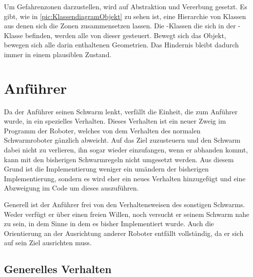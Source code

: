 Um Gefahrenzonen darzustellen, wird auf Abstraktion und Vererbung gesetzt. Es gibt, wie in \autoref{pic:KlassendiagramObjekt} zu sehen ist, eine Hierarchie von Klassen aus denen sich die Zonen zusammensetzen lassen. Die -Klassen die sich in der -Klasse befinden, werden alle von dieser gesteuert. Bewegt sich das Objekt, bewegen sich alle darin enthaltenen Geometrien. Das Hindernis bleibt dadurch immer in einem plausiblen Zustand. 


%










\section{Anführer}

Da der Anführer seinen Schwarm lenkt, verfällt die Einheit, die zum Anführer wurde, in ein spezielles Verhalten. Dieses Verhalten ist ein neuer Zweig im Programm der Roboter, welches von dem Verhalten des normalen Schwarmroboter gänzlich abweicht. Auf das Ziel zuzusteuern und den Schwarm dabei nicht zu verlieren, ihn sogar wieder einzufangen, wenn er abhanden kommt, kann mit den bisherigen Schwarmregeln nicht umgesetzt werden. Aus diesem Grund ist die Implementierung weniger ein umändern der bisherigen Implementierung, sondern es wird eher ein neues Verhalten hinzugefügt und eine Abzweigung im Code um dieses auszuführen.

Generell ist der Anführer frei von den Verhaltensweisen des sonstigen Schwarms. Weder verfügt er über einen freien Willen, noch versucht er seinem Schwarm nahe zu sein, in dem Sinne in dem es bisher Implementiert wurde. Auch die Orientierung an der Ausrichtung anderer Roboter entfällt vollständig, da er sich auf sein Ziel ausrichten muss.

\subsection*{Generelles Verhalten}

